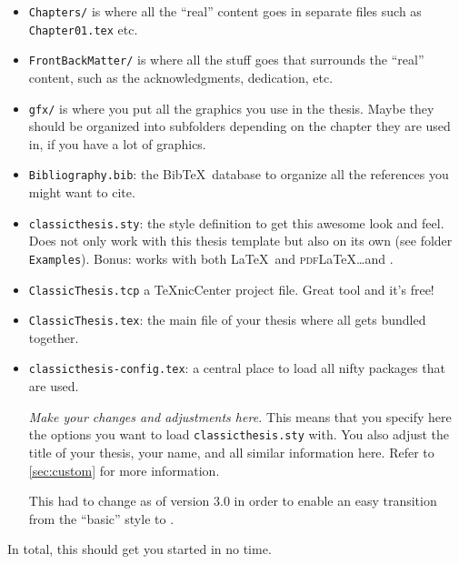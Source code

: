 \begin{itemize}
    \item\texttt{Chapters/} is where all the ``real'' content goes in
    separate files such as \texttt{Chapter01.tex} etc.
    \item\texttt{FrontBackMatter/} is where all the stuff goes that
    surrounds the ``real'' content, such as the acknowledgments,
    dedication, etc.
    \item\texttt{gfx/} is where you put all the graphics you use in
    the thesis. Maybe they should be organized into subfolders
    depending on the chapter they are used in, if you have a lot of
    graphics.
    \item\texttt{Bibliography.bib}: the Bib\TeX\ database to organize
    all the references you might want to cite.
    \item\texttt{classicthesis.sty}: the style definition to get this
    awesome look and feel. Does not only work with this thesis template
    but also on its own (see folder \texttt{Examples}). Bonus: works
    with both \LaTeX\ and \textsc{pdf}\LaTeX\dots and \mLyX.
    \item\texttt{ClassicThesis.tcp} a \TeX nicCenter project file.
    Great tool and it's free!
    \item\texttt{ClassicThesis.tex}: the main file of your thesis
    where all gets bundled together.
    \item\texttt{classicthesis-config.tex}: a central place to load all 
    nifty packages that are used. %
    
    \emph{Make your changes and adjustments here.} This means that you  
    specify here the options you want to load \texttt{classicthesis.sty} 
    with. You also adjust the title of your thesis, your name, and all 
    similar information here. Refer to \autoref{sec:custom} for more 
    information.
    
        This had to change as of version 3.0 in order to enable an easy 
        transition from the ``basic'' style to \mLyX.
    
\end{itemize}
In total, this should get you started in no time.


